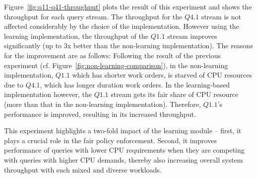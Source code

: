 

Figure~\ref{fig:q11-q41-throughput} plots the result of this experiment and shows the throughput for each query stream. 
The throughput for the $Q4.1$ stream is not affected considerably by the choice of the implementation. 
However using the learning implementation, the throughput of the $Q1.1$ stream improves significantly (up to 3x better than the non-learning implementation). 
The reasons for the improvement are as follows:
Following the result of the previous experiment (cf. Figure~\ref{fig:non-learning-comparison}), in the non-learning implementation, $Q1.1$ which has shorter work orders, is starved of CPU resources due to $Q4.1$, which has longer duration work orders. 
In the learning-based implementation however, the $Q1.1$ stream gets its fair share of CPU resource (more than that in the non-learning implementation). 
Therefore, $Q1.1$'s performance is improved, resulting in its increased throughput. 

This experiment highlights a two-fold impact of the learning module -- first, it plays a crucial role in the fair policy enforcement. 
Second, it improves performance of queries with lower CPU requirements when they are competing with queries with higher CPU demands, thereby also increasing overall system throughput with such mixed and diverse workloads. 

